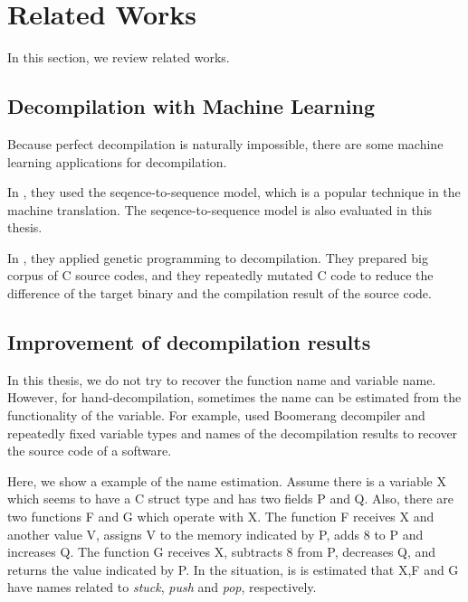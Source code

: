 \documentclass[senior,final,11pt]{iscs-thesis}
\begin{document}

\chapter{Related Works}
In this section, we review related works.

\section{Decompilation with Machine Learning}

Because perfect decompilation is naturally impossible, there are some machine learning applications for decompilation.

In \cite{Motoneta}, they used the seqence-to-sequence model, which is a popular technique in the machine translation.
The seqence-to-sequence model is also evaluated in this thesis.

In \cite{genetic_decompiler}, they applied genetic programming to decompilation.
They prepared big corpus of C source codes, and they repeatedly mutated C code to reduce the difference of the target binary and the compilation result of the source code. 



% 

\section{Improvement of decompilation results}
In this thesis, we do not try to recover the function name and variable name. 
However, for hand-decompilation, sometimes the name can be estimated from the functionality of the variable.
For example, \cite{hand_decompilation} used Boomerang decompiler and repeatedly fixed variable types and names of the decompilation results 
to recover the source code of a software.

Here, we show a example of the name estimation.
Assume there is a variable X which seems to have a C struct type and has two fields P and Q.
Also, there are two functions F and G which operate with X. 
The function F receives X and another value V, assigns V to the memory indicated by P, adds 8 to P and increases Q. 
The function G receives X, subtracts 8 from P, decreases Q, and returns the value indicated by P.
In the situation, is is estimated that X,F and G have names related to {\sl stuck}, {\sl push} and {\sl pop}, respectively.
\end{document}

